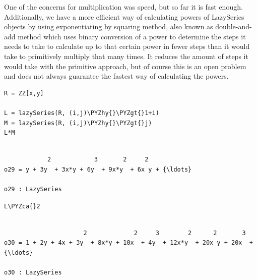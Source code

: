\documentclass[11pt]{article}
\makeatletter
\def\PYZca{\char`\^}
\def\PYZgt{\char`\>}
\def\PYZhy{\char`\-}
\newcommand{\boxspacing}{\kern\kvtcb@left@rule\kern\kvtcb@boxsep}
\newcommand{\prompt}[4]{
        {\ttfamily\llap{{\color{#2}[#3]:\hspace{3pt}#4}}\vspace{-\baselineskip}}
    }
\makeatother
\begin{document}
One of the concerns for multiplication was speed, but so far it is fast
enough. Additionally, we have a more efficient way of calculating powers
of LazySeries objects by using exponentiating by squaring method, also
known as double-and-add method which uses binary conversion of a power
to determine the steps it needs to take to calculate up to that certain
power in fewer steps than it would take to primitively multiply that
many times. It reduces the amount of steps it would take with the
primitive approach, but of course this is an open problem and does not
always guarantee the fastest way of calculating the powers.

    \begin{tcolorbox}[breakable, size=fbox, boxrule=1pt, pad at break*=1mm,colback=cellbackground, colframe=cellborder]
\prompt{In}{incolor}{29}{\boxspacing}
\begin{Verbatim}[commandchars=\\\{\}]
R = ZZ[x,y]

L = lazySeries(R, (i,j)\PYZhy{}\PYZgt{}1+i)
M = lazySeries(R, (i,j)\PYZhy{}\PYZgt{}j)
L*M
\end{Verbatim}
\end{tcolorbox}

    \begin{Verbatim}[commandchars=\\\{\}]

            2            3       2     2
o29 = y + 3y  + 3x*y + 6y  + 9x*y  + 6x y + {\ldots}

o29 : LazySeries
    \end{Verbatim}

    \begin{tcolorbox}[breakable, size=fbox, boxrule=1pt, pad at break*=1mm,colback=cellbackground, colframe=cellborder]
\prompt{In}{incolor}{30}{\boxspacing}
\begin{Verbatim}[commandchars=\\\{\}]
L\PYZca{}2
\end{Verbatim}
\end{tcolorbox}

    \begin{Verbatim}[commandchars=\\\{\}]

                      2             2     3        2      2       3
o30 = 1 + 2y + 4x + 3y  + 8x*y + 10x  + 4y  + 12x*y  + 20x y + 20x  + {\ldots}

o30 : LazySeries
    \end{Verbatim}
\end{document}
